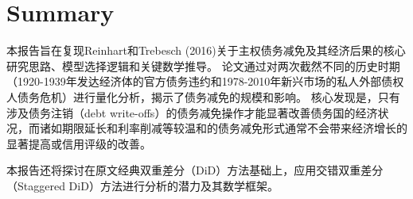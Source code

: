 \chapter*{Summary}

本报告旨在复现Reinhart和Trebesch (2016)关于主权债务减免及其经济后果的核心研究思路、模型选择逻辑和关键数学推导。
论文通过对两次截然不同的历史时期（1920-1939年发达经济体的官方债务违约和1978-2010年新兴市场的私人外部债权人债务危机）进行量化分析，揭示了债务减免的规模和影响。
核心发现是，只有涉及债务注销（debt write-offs）的债务减免操作才能显著改善债务国的经济状况，而诸如期限延长和利率削减等较温和的债务减免形式通常不会带来经济增长的显著提高或信用评级的改善。

本报告还将探讨在原文经典双重差分（DiD）方法基础上，应用交错双重差分（Staggered DiD）方法进行分析的潜力及其数学框架。